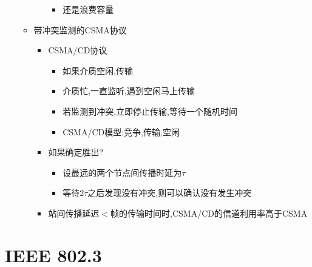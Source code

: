 \documentclass[a4paper,12pt,notitlepage]{article}
\begin{document}
\begin{itemize}
\begin{itemize}
\begin{itemize}
\begin{itemize}
				\item 还是浪费容量
			\end{itemize}
		\end{itemize}
		\item 带冲突监测的CSMA协议
		\begin{itemize}
			\item CSMA/CD协议
			\begin{itemize}
				\item 如果介质空闲,传输
				\item 介质忙,一直监听,遇到空闲马上传输
				\item 若监测到冲突,立即停止传输,等待一个随机时间
				\item CSMA/CD模型:竞争,传输,空闲
			\end{itemize}
			\item 如果确定胜出?
			\begin{itemize}
				\item 设最远的两个节点间传播时延为$\tau$
				\item 等待$2\tau$之后发现没有冲突,则可以确认没有发生冲突
			\end{itemize}
			\item 站间传播延迟$<$帧的传输时间时,CSMA/CD的信道利用率高于CSMA
		\end{itemize}
	\end{itemize}
\end{itemize}

\section{IEEE 802.3}
\end{document}
